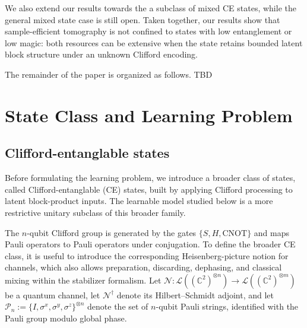 \documentclass[
  aps,
  prx,
  reprint,
  superscriptaddress,
  amsmath,
  amssymb,
  nofootinbib,
  longbibliography
]{revtex4-2}
\newcommand{\Pc}{\mathcal{P}}
\newcommand{\map}[1]{\mathcal{#1}}
\begin{document}
We also extend our results towards the a subclass of mixed CE states, while the general mixed state case is still open. Taken together, our results show that sample-efficient tomography is not confined to states with low entanglement or low magic: both resources can be extensive when the state retains bounded latent block structure under an unknown Clifford encoding. 


The remainder of the paper is organized as follows. TBD

\section{State Class and Learning Problem}

\subsection{Clifford-entanglable states}

Before formulating the learning problem, we introduce a broader class of states,
called Clifford-entanglable (CE) states, built by applying Clifford processing
to latent block-product inputs.  The learnable model studied below is a more
restrictive unitary subclass of this broader family.

The $n$-qubit Clifford group is generated by the gates
$\{S,H,\mathrm{CNOT}\}$ and maps Pauli operators to Pauli operators under
conjugation. To define the broader CE class, it is useful to introduce the
corresponding Heisenberg-picture notion for channels, which also allows
preparation, discarding, dephasing, and classical mixing within the stabilizer
formalism. Let
$\map N:\mathcal L((\mathbb C^2)^{\otimes n})
\to \mathcal L((\mathbb C^2)^{\otimes m})$
be a quantum channel, let $\map N^\dagger$ denote its
Hilbert--Schmidt adjoint, and let
$\Pc_n:=\{I,\sigma^x,\sigma^y,\sigma^z\}^{\otimes n}$
denote the set of $n$-qubit Pauli strings, identified with the Pauli group
modulo global phase.
\end{document}
